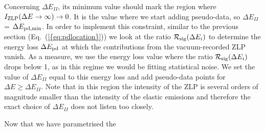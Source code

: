 Concerning $\Delta E_{II}$, its minimum value should mark the region where $I_{\rm ZLP}(\Delta E\to \infty)\to 0$. 
%
It is the value where we start adding pseudo-data, so $\Delta E_{II}$ = $\Delta E_{\rm pd,min}$.
%
In order to implement this constraint, similar to the previous section (Eq.~(\ref{{eq:pdlocation}}))
we look at the ratio 
$\mathcal{R}_{\rm sig}(\Delta E_i)$ to determine the energy loss $\Delta E_{\rm pd}$ at 
which the contributions from the vacuum-recorded ZLP vanish. 
%
As a measure, we use the energy loss value where the ratio $\mathcal{R}_{\rm sig}(\Delta E_i)$ drops below 1,
as in this regime we would be fitting statistical noise.
%
We set the value of $\Delta E_{II}$ equal to this energy loss and add pseudo-data points for $\Delta E \ge \Delta E_{II}$.
%
Note that in this region the intensity of the ZLP is several orders of magnitude smaller than the intensity 
of the elastic emissions and therefore the exact choice of $\Delta E_{II}$ does not listen too closely.

Now that we have parametrised the 
